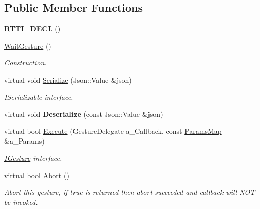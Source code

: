 \subsection*{Public Member Functions}
\begin{DoxyCompactItemize}
\item 
\mbox{\label{class_wait_gesture_adb42a30b594fbe6c836484d0fa8e08e7}} 
{\bfseries R\+T\+T\+I\+\_\+\+D\+E\+CL} ()
\item 
\mbox{\label{class_wait_gesture_acdd53753c30823b32c9b3234ea68c16c}} 
\hyperlink{class_wait_gesture_acdd53753c30823b32c9b3234ea68c16c}{Wait\+Gesture} ()
\begin{DoxyCompactList}\small\item\em Construction. \end{DoxyCompactList}\item 
\mbox{\label{class_wait_gesture_a0bd3c78bce0890a9cb3e603089a30bec}} 
virtual void \hyperlink{class_wait_gesture_a0bd3c78bce0890a9cb3e603089a30bec}{Serialize} (Json\+::\+Value \&json)
\begin{DoxyCompactList}\small\item\em I\+Serializable interface. \end{DoxyCompactList}\item 
\mbox{\label{class_wait_gesture_ac7ef5539f00e7f8543c32acd7633882b}} 
virtual void {\bfseries Deserialize} (const Json\+::\+Value \&json)
\item 
\mbox{\label{class_wait_gesture_a2f775dd69f877bf21382e963af61c337}} 
virtual bool \hyperlink{class_wait_gesture_a2f775dd69f877bf21382e963af61c337}{Execute} (Gesture\+Delegate a\+\_\+\+Callback, const \hyperlink{class_params_map}{Params\+Map} \&a\+\_\+\+Params)
\begin{DoxyCompactList}\small\item\em \hyperlink{class_i_gesture}{I\+Gesture} interface. \end{DoxyCompactList}\item 
\mbox{\label{class_wait_gesture_a831908a332246f6234f47adfe827d575}} 
virtual bool \hyperlink{class_wait_gesture_a831908a332246f6234f47adfe827d575}{Abort} ()
\begin{DoxyCompactList}\small\item\em Abort this gesture, if true is returned then abort succeeded and callback will N\+OT be invoked. \end{DoxyCompactList}\end{DoxyCompactItemize}
